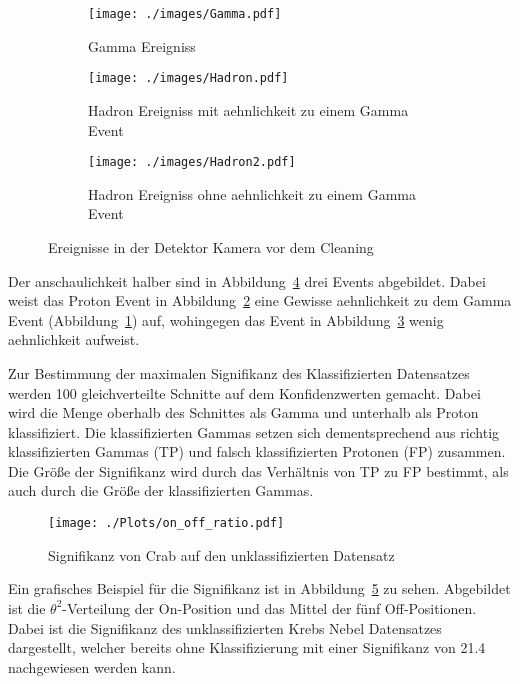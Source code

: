 \begin{figure}[H]
  \centering
\begin{subfigure}[t]{0.3\textwidth}
  \centering
  \texttt{[image: ./images/Gamma.pdf]}
  \caption{Gamma Ereigniss}
  \label{fig:gammaevent}
\end{subfigure}
\begin{subfigure}[t]{0.3\textwidth}
  \centering
  \texttt{[image: ./images/Hadron.pdf]}
  \caption{Hadron Ereigniss mit aehnlichkeit zu einem Gamma Event}
  \label{fig:hadevent}
\end{subfigure}
\begin{subfigure}[t]{0.3\textwidth}
  \centering
  \texttt{[image: ./images/Hadron2.pdf]}
  \caption{Hadron Ereigniss ohne aehnlichkeit zu einem Gamma Event}
  \label{fig:had2event}
\end{subfigure}
\caption{Ereignisse in der Detektor Kamera vor dem Cleaning \cite{??}}
\label{fig:picevents}
\end{figure}
Der anschaulichkeit halber sind in Abbildung~\ref{fig:picevents} drei Events abgebildet.
Dabei weist das Proton Event in Abbildung~\ref{fig:hadevent} eine Gewisse aehnlichkeit zu dem Gamma Event (Abbildung~\ref{fig:gammaevent}) auf, wohingegen das Event in Abbildung~\ref{fig:had2event} wenig aehnlichkeit aufweist.

Zur Bestimmung der maximalen Signifikanz des Klassifizierten Datensatzes werden 100 gleichverteilte Schnitte auf dem Konfidenzwerten gemacht.
Dabei wird die Menge oberhalb des Schnittes als Gamma und unterhalb als Proton klassifiziert. 
Die klassifizierten Gammas setzen sich dementsprechend aus richtig klassifizierten Gammas (TP) und falsch klassifizierten Protonen (FP) zusammen. 
Die Größe der Signifikanz wird durch das Verhältnis von TP zu FP bestimmt, als auch durch die Größe der klassifizierten Gammas.
\begin{figure}[H]
  \centering
  \texttt{[image: ./Plots/on\_off\_ratio.pdf]}
  \caption{Signifikanz von Crab auf den unklassifizierten Datensatz}
  \label{fig:sig_crab}
\end{figure}
Ein grafisches Beispiel für die Signifikanz ist in Abbildung~\ref{fig:sig_crab} zu sehen. 
Abgebildet ist die $\theta^{2}$-Verteilung der On-Position und das Mittel der fünf Off-Positionen.
Dabei ist die Signifikanz des unklassifizierten Krebs Nebel Datensatzes dargestellt, welcher bereits ohne Klassifizierung mit einer Signifikanz von \SI{21,4}{\sigma} nachgewiesen werden kann.

